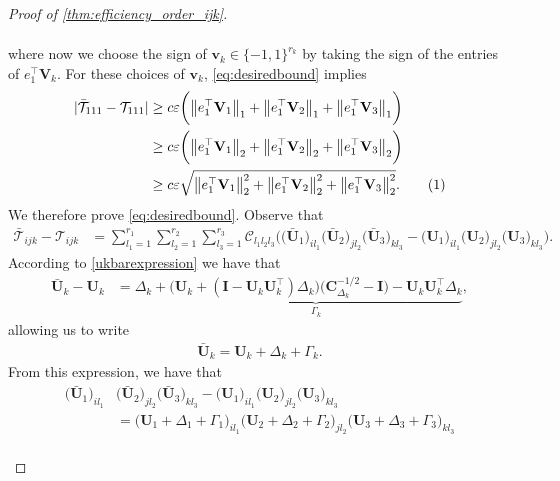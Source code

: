 \documentclass[10pt]{article}
\newcommand{\0}{{\mathbf{0}}}
\newcommand{\1}{{\mathbf{1}}}
\newcommand{\I}{{\mathbf{I}}}
\newcommand{\U}{{\mathbf{U}}}
\renewcommand{\t}{^{\top}}
\newcommand{\eps}{\varepsilon}
\newcommand\numberthis{\addtocounter{equation}{1}\tag{\theequation}}
\begin{document}
\begin{proof}[Proof of \cref{thm:efficiency_order_ijk}]
\begin{itemize}
\begin{align*}
\end{align*}
where now we choose the sign of $\mathbf{v}_k \in \{-1,1\}^{r_k}$ by taking the sign of the entries of $e_{1}\t \mathbf{V}_k$. For these choices of $\mathbf{v}_k$, \eqref{eq:desiredbound} implies
\begin{align*}
    |  \mathcal{\bar T}_{111} - \mathcal{T}_{111} | &\geq c \eps \bigg( \big\| e_{1}\t \mathbf{V}_1 \big\|_1 + \big\| e_{1}\t \mathbf{V}_2 \big\|_1 + \big\| e_{1}\t \mathbf{V}_3 \big\|_1 \bigg) \\
    &\geq c \eps \bigg( \big\| e_{1}\t \mathbf{V}_1 \big\|_2 + \big\| e_{1}\t \mathbf{V}_2 \big\|_2 + \big\| e_{1}\t \mathbf{V}_3 \big\|_2 \bigg) \\
    &\geq c \eps \sqrt{ \big\|e_{1}\t \mathbf{V}_1 \big\|_2^2 + \big\| e_{1}\t \mathbf{V}_2 \big\|_2^2 + \big\| e_{1}\t \mathbf{V}_3 \big\|_2^2} . \numberthis \label{lowerboundtoprovetoday}
\end{align*}
We therefore prove \eqref{eq:desiredbound}.  Observe that
\begin{align*}
    \mathcal{\bar T}_{ijk} - \mathcal{T}_{ijk} &= \sum_{l_1=1}^{r_1} \sum_{l_2=1}^{r_2} \sum_{l_3=1}^{r_3} \mathcal{C}_{l_1l_2l_3} \bigg(\big(\mathbf{\bar U}_1\big)_{il_1} \big(\mathbf{\bar U}_2\big)_{jl_2} \big(\mathbf{\bar U}_3\big)_{kl_3} -  \big(\U_1\big)_{il_1} \big(\U_2\big)_{jl_2} \big(\U_3\big)_{kl_3} \bigg).
    \end{align*}
According to \eqref{ukbarexpression} we have that
\begin{align*}
    \mathbf{\bar U}_k - \U_k %
    &= \Delta_k  +  \underbrace{\bigg( \U_k + (\I -\U_k\U_k\t)\Delta_k \bigg) \bigg( \mathbf{C}_{\Delta_k}^{-1/2} - \I \bigg) - \U_k \U_k\t \Delta_k }_{\Gamma_k},
\end{align*}
allowing us to write
\begin{align*}
    \mathbf{\bar U}_k = \U_k +\Delta_k  + \Gamma_k.
\end{align*}
From this expression, we have that
\begin{align*}
  \big(\mathbf{\bar U}_1\big)_{il_1} &\big(\mathbf{\bar U}_2\big)_{jl_2} \big(\mathbf{\bar U}_3\big)_{kl_3} -  \big(\U_1\big)_{il_1} \big(\U_2\big)_{jl_2} \big(\U_3\big)_{kl_3} \\
  &=  \big(\mathbf{ U}_1 + \Delta_1 + \Gamma_1\big)_{il_1} \big(\mathbf{ U}_2 + \Delta_2 + \Gamma_2\big)_{jl_2} \big(\mathbf{ U}_3 + \Delta_3 + \Gamma_3\big)_{kl_3} \\

\end{align*}
\end{itemize}
\end{proof}
\end{document}
